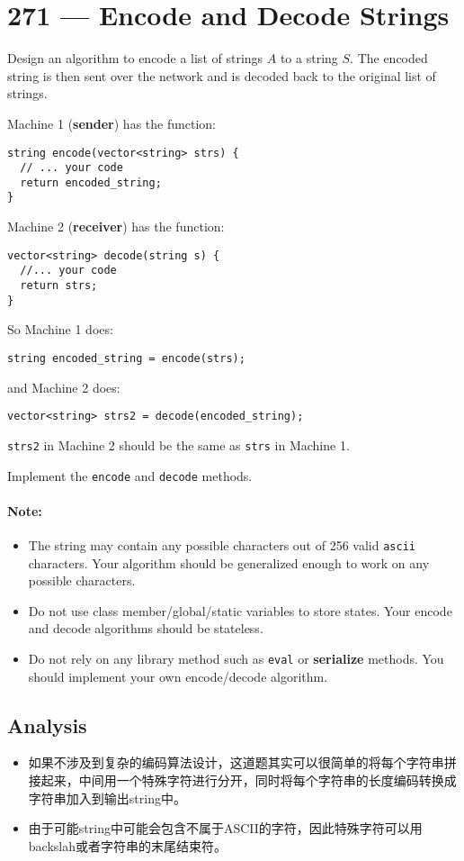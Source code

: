\section{271 --- Encode and Decode Strings}
Design an algorithm to encode a list of strings $A$ to a string $S$. The encoded string is then sent over the network and is decoded back to the original list of strings.
\par
Machine 1 (\textbf{sender}) has the function:

\begin{lstlisting}[style=customc]
string encode(vector<string> strs) {
  // ... your code
  return encoded_string;
}
\end{lstlisting}

Machine 2 (\textbf{receiver}) has the function:

\begin{lstlisting}[style=customc]
vector<string> decode(string s) {
  //... your code
  return strs;
}
\end{lstlisting}
 

So Machine 1 does:

\begin{lstlisting}[style=customc]
string encoded_string = encode(strs);
\end{lstlisting}
 

and Machine 2 does:

\begin{lstlisting}[style=customc]
vector<string> strs2 = decode(encoded_string);
\end{lstlisting}
 

\texttt{strs2} in Machine 2 should be the same as \texttt{strs} in Machine 1.
\par
Implement the \texttt{encode} and \texttt{decode} methods.

\paragraph{Note:}

\begin{itemize}
\item The string may contain any possible characters out of 256 valid \texttt{ascii} characters. Your algorithm should be generalized enough to work on any possible characters.
\item Do not use class member/global/static variables to store states. Your encode and decode algorithms should be stateless.
\item Do not rely on any library method such as \texttt{eval} or \textbf{serialize} methods. You should implement your own encode/decode algorithm.
\end{itemize}
\subsection{Analysis}
\begin{itemize}
\item 如果不涉及到复杂的编码算法设计，这道题其实可以很简单的将每个字符串拼接起来，中间用一个特殊字符进行分开，同时将每个字符串的长度编码转换成字符串加入到输出string中。
\item 由于可能string中可能会包含不属于ASCII的字符，因此特殊字符可以用backslah或者字符串的末尾结束符。
\end{itemize}